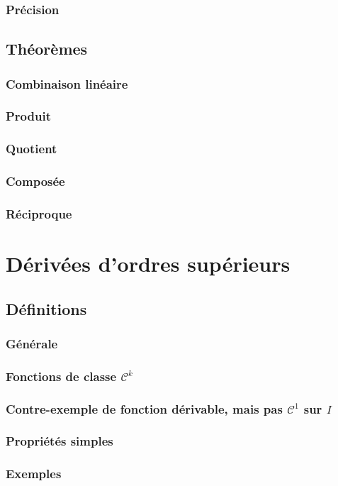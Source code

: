 \documentclass[12pt,a4paper,french]{book}
\begin{document}
			\subsubsection{Précision}
		\subsection{Théorèmes}
			\subsubsection{Combinaison linéaire}
			\subsubsection{Produit}
			\subsubsection{Quotient}
			\subsubsection{Composée}
			\subsubsection{Réciproque}
	\section{Dérivées d'ordres supérieurs}
		\subsection{Définitions}
			\subsubsection{Générale}
			\subsubsection{Fonctions de classe $\mathcal{C}^{k}$}
			\subsubsection{Contre-exemple de fonction dérivable, mais pas $\mathcal{C}^{1}$ sur $I$}
			\subsubsection{Propriétés simples}
			\subsubsection{Exemples}
\end{document}
